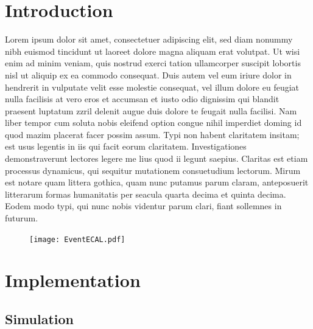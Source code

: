 \documentclass[final,3p,times,twocolumn]{elsarticle}
\begin{document}
\linenumbers 



\section{Introduction}
Lorem ipsum dolor sit amet, consectetuer adipiscing elit, sed diam nonummy nibh euismod tincidunt ut laoreet dolore magna aliquam erat volutpat. Ut wisi enim ad minim veniam, quis
nostrud exerci tation ullamcorper suscipit lobortis nisl ut aliquip ex ea commodo consequat. Duis autem vel eum iriure dolor in hendrerit in vulputate velit esse molestie consequat,
vel illum dolore eu feugiat nulla facilisis at vero eros et accumsan et iusto odio dignissim qui blandit praesent luptatum zzril delenit augue duis dolore te feugait nulla facilisi.
Nam liber tempor cum soluta nobis eleifend option congue nihil imperdiet doming id quod mazim placerat facer possim assum. Typi non habent claritatem insitam; est usus legentis in
iis qui facit eorum claritatem. Investigationes demonstraverunt lectores legere me lius quod ii legunt saepius. Claritas est etiam processus dynamicus, qui sequitur mutationem
consuetudium lectorum. Mirum est notare quam littera gothica, quam nunc putamus parum claram, anteposuerit litterarum formas humanitatis per seacula quarta decima et quinta
decima. Eodem modo typi, qui nunc nobis videntur parum clari, fiant sollemnes in futurum.

\begin{figure}[!h]
  \begin{center}
     \texttt{[image: EventECAL.pdf]}
     \caption{\label{}}
  \end{center}
\end{figure}


\section{Implementation}

\subsection{Simulation}
\end{document}
